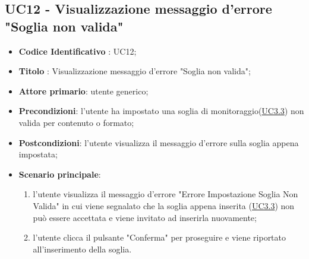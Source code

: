 	\subsection{UC12 - Visualizzazione messaggio d'errore "Soglia non valida"}
		\begin{itemize}
			\item\textbf{Codice Identificativo} : UC12;
			\item\textbf{Titolo} : Visualizzazione messaggio d'errore "Soglia non valida";
			\item\textbf{Attore primario}: utente generico;
			\item\textbf{Precondizioni}: l'utente ha impostato una soglia di monitoraggio(\hyperref[par:UC3.3]{UC3.3}) non valida per contenuto o formato;
			\item\textbf{Postcondizioni}: l'utente visualizza il messaggio d'errore sulla soglia appena impostata;		
			\item\textbf{Scenario principale}:
				\begin{enumerate}
					\item l'utente visualizza il messaggio d'errore "Errore Impostazione Soglia Non Valida" in cui viene segnalato che la soglia appena inserita (\hyperref[par:UC3.3]{UC3.3}) non può essere accettata e viene invitato ad inserirla nuovamente;
					\item l'utente clicca il pulsante "Conferma" per proseguire e viene riportato all'inserimento della soglia.		
				\end{enumerate}		
		\end{itemize}


	\label{par:UC13}
